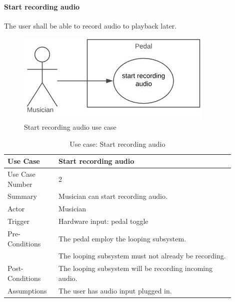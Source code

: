         \paragraph{Start recording audio} 
        The user shall be able to record audio to playback later.
        \begin{figure}[!ht]
                \centering
                \includegraphics[width=.5\textwidth]{diagrams/use_cases/uc-record-start.JPG}
                \caption{Start recording audio use case}
                \label{fig:uc-record-start }
            \end{figure}
        \begin{table}[!ht]
            \centering
            \begin{tabular}{| p{0.2\linewidth} | p{0.7\linewidth} |}
                \hline
                Use Case & Start recording audio  \\ \hline \hline
                Use Case Number & 2 \\ \hline
                Summary & Musician can start recording audio. \\ \hline
                Actor & Musician \\ \hline
                Trigger & Hardware input: pedal toggle \\ \hline
                Pre-Conditions & The pedal employ the looping subsystem. \\
                & The looping subsystem must not already be recording. \\ \hline
                Post-Conditions & The looping subsystem will be recording incoming audio. \\ \hline
                Assumptions & The user has audio input plugged in.\\ \hline
            \end{tabular}
            \\
            \caption{Use case: Start recording audio}
            \label{tab:uc-record-start}
        \end{table}
        
        \clearpage
